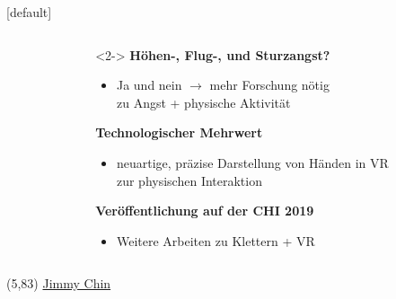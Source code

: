 {
	[default]
	\begin{frame}[plain]{\color{primary}{Fazit \& Ausblick}}
	
	\begin{columns}
		\begin{column}{0.4\textwidth}

		\end{column}
		\begin{column}{0.6\textwidth}
			\begin{exampleblock}{}<2->
				\textbf{Höhen-, Flug-, \textcolor{secondary}{und Sturzangst?}}
				\begin{itemize}[label=\textcolor{tertiary}{}]
					\item Ja und nein $\rightarrow$ mehr Forschung nötig\\zu Angst + physische Aktivität
				\end{itemize}
				\textbf{Technologischer Mehrwert}
				\begin{itemize}[label=\textcolor{tertiary}{}]
					\item neuartige, präzise Darstellung von Händen in VR\\zur physischen Interaktion
				\end{itemize}
				\textbf{Veröffentlichung auf der \textcolor{secondary}{CHI 2019}}
				\begin{itemize}[label=\textcolor{tertiary}{}]
					\item Weitere Arbeiten zu Klettern + VR
				\end{itemize}
			\end{exampleblock}
		\end{column}
	\end{columns}
	
	\begin{textblock}{50}(5,83)
		\href{http://www.accidentofgeography.com/alex-honnold-epic-el-capitan-triumph/}{	\textcolor{tertiary}{{\small \textcopyright Jimmy Chin}}} 
	\end{textblock}
	\end{frame}
}


